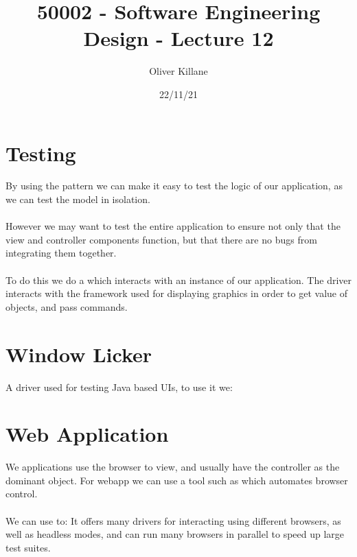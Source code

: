 \documentclass{report}
\title{50002 - Software Engineering Design - Lecture 12}
\author{Oliver Killane}
\date{22/11/21}
\begin{document}
\maketitle
{}

\section*{Testing}
By using the  pattern we can make it easy to test the logic of our application, as we can test the model in isolation.
\\
\\ However we may want to test the entire application to ensure not only that the view and controller components function, but that there are no bugs from integrating them together.
\\
\\ To do this we do a  which interacts with an instance of our application.
The driver interacts with the framework used for displaying graphics in order to get value of objects, and pass commands.

\section*{Window Licker}
A driver used for testing Java based UIs, to use it we:
\begin{enumerate}
\end{enumerate}

\section*{Web Application}
We applications use the browser to view, and usually have the controller as the dominant object.
For webapp we can use a tool such as  which automates browser control.
\\
\\ We can use  to:
It offers many drivers for interacting using different browsers, as well as headless modes, and can run many browsers in parallel to speed up large test suites.
\end{document}
